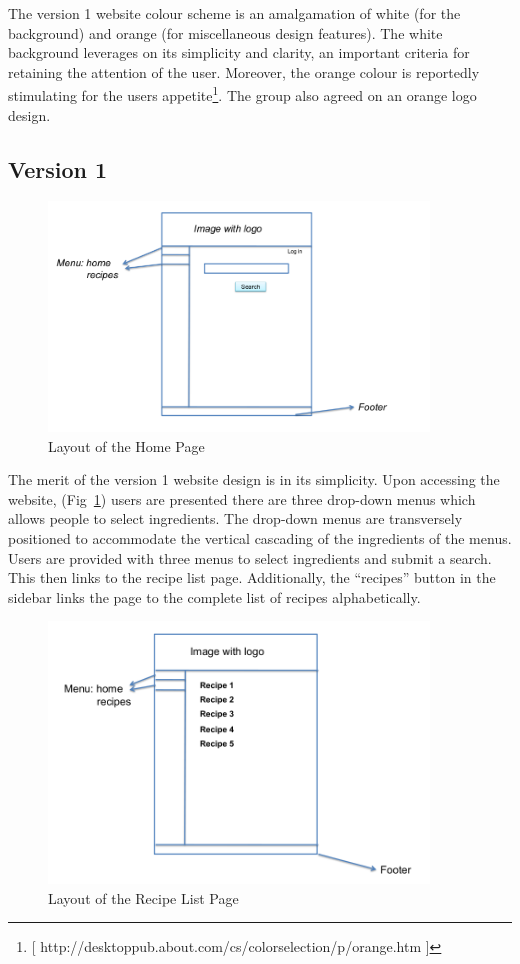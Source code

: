 The version 1 website colour scheme is an amalgamation of white (for the background) and orange (for miscellaneous design features). The white background leverages on its simplicity and clarity, an important criteria for retaining the attention of the user. Moreover, the orange colour is reportedly stimulating for the users appetite\footnote{[ http://desktoppub.about.com/cs/colorselection/p/orange.htm ]}. The group also agreed on an orange logo design. 

\subsection{Version 1}

\begin{figure}
\includegraphics[width=0.9\textwidth]{home_page}
\caption{Layout of the Home Page}
\label{fig:home_page}
\end{figure}

The merit of the version 1 website design is in its simplicity. Upon accessing the website, (Fig~\ref{fig:home_page}) users are presented there are three drop-down menus which allows people to select ingredients. The drop-down menus are transversely positioned to accommodate the vertical cascading of the ingredients of the menus. Users are provided with three menus to select ingredients and submit a search. This then links to the recipe list page. Additionally, the “recipes” button in the sidebar links the page to the complete list of recipes alphabetically.

\begin{figure}
\includegraphics[width=0.9\textwidth]{recipe_list_page}
\caption{Layout of the Recipe List Page}
\label{fig:recipe_list}
\end{figure}

